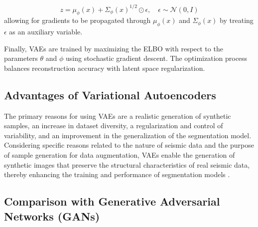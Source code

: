 \documentclass{ieeeaccess}
\begin{document}
\begin{equation}
z = \mu_\phi(x) + \Sigma_\phi(x)^{1/2} \odot \epsilon, \quad \epsilon \sim \mathcal{N}(0, I)
\end{equation}
allowing for gradients to be propagated through $\mu_\phi(x)$ and $\Sigma_\phi(x)$ by treating $\epsilon$ as an auxiliary variable.

Finally, VAEs are trained by maximizing the ELBO with respect to the parameters $\theta$ and $\phi$ using stochastic gradient descent. The optimization process balances reconstruction accuracy with latent space regularization.

\subsection*{Advantages of Variational Autoencoders}
The primary reasons for using VAEs are a realistic generation of synthetic samples, an increase in dataset diversity, a regularization and control of variability, and an improvement in the generalization of the segmentation model. Considering specific reasons related to the nature of seismic data and the purpose of sample generation for data augmentation, VAEs enable the generation of synthetic images that preserve the structural characteristics of real seismic data, thereby enhancing the training and performance of segmentation models \cite{ref1} \cite{ref15} \cite{ref18}.

\subsection*{Comparison with Generative Adversarial Networks (GANs)}
\end{document}
